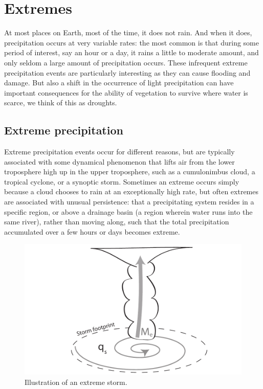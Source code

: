 \documentclass[12pt]{book}
\begin{document}
\section{Extremes}
At most places on Earth, most of the time, it does not rain. And when it does, precipitation occurs at very variable rates: the most common is that during some  period of interest, say an hour or a day, it rains a little to moderate amount, and only seldom a large amount of precipitation occurs. These infrequent extreme precipitation events are particularly interesting as they can cause flooding and damage. But also a shift in the occurrence of light precipitation can have important consequences for the ability of vegetation to survive where water is scarce, we think of this as droughts. 


\subsection{Extreme precipitation}
Extreme precipitation events occur for different reasons, but are typically associated with some dynamical phenomenon that lifts air from the lower troposphere high up in the upper troposphere, such as a cumulonimbus cloud, a tropical cyclone, or a synoptic storm. Sometimes an extreme occurs simply because a cloud chooses to rain at an exceptionally high rate, but often extremes are associated with unusual persistence: that a precipitating system resides in a specific region, or above a drainage basin (a region wherein water runs into the same river), rather than moving along, such that the total precipitation accumulated over a few hours or days becomes extreme. 
\begin{figure}
\begin{center}
\includegraphics[height=6 cm]{../Illustrations/Extreme_storm_dynamics.pdf}
\end{center}
\caption{ Illustration of an extreme storm. } 
\label{fig:extreme_storm_dynamics}
\end{figure}
\end{document}

